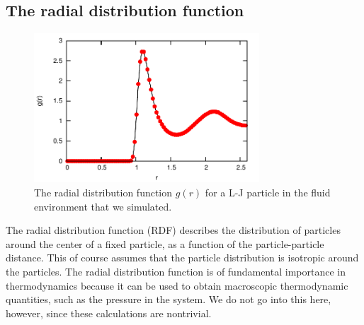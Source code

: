 \documentclass[
paper=a4,                       %
fontsize=11pt,                  %
twoside,                        %
footsepline,                    %
headsepline,                    %
headinclude=false,              %
footinclude=false,              %
pagesize,                       %
]{scrartcl}
\newtheorem{task}{Task}
\begin{document}
\subsection{The radial distribution function}

\begin{figure}[!ht]
\begin{center}
\includegraphics[width=0.75\textwidth]{figures/rdf}
\caption{\label{fig:rdf} The radial distribution function $g(r)$ for a L-J particle in the fluid environment that we simulated.}
\end{center}
\end{figure}

The radial distribution function (RDF) describes the distribution of particles around the center of a fixed particle, as a function of the particle-particle distance. This of course assumes that the particle distribution is isotropic around the particles. The radial distribution function is of fundamental importance in thermodynamics because it can be used to obtain macroscopic thermodynamic quantities, such as the pressure in the system. We do not go into this here, however, since these calculations are nontrivial.

\vspace{1cm}
\vspace{1cm}
\end{document}
